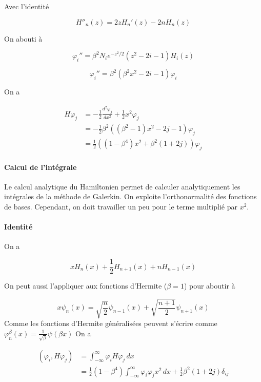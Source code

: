 \documentclass[11pt]{article}
\begin{document}
Avec l'identité

\[
H''_{n}(z)=2zH_{n}'(z)-2nH_{n}(z)
\]

On abouti à

\[
\varphi_{i}''=\beta^{2}N_{i}e^{-z^{2}/2}(z^{2}-2i-1)H_{i}(z)
\]

\[
\varphi_{i}''=\beta^{2}(\beta^{2}x^{2}-2i-1)\varphi_{i}
\]

On a

\[
\begin{aligned}
H\varphi_{j} & = -\frac{1}{2} \frac{d^{2}\varphi_{j}}{dx^{2}} + \frac{1}{2}x^{2}\varphi_{j} \\
&=-\frac{1}{2}\beta^{2}((\beta^{2}-1)x^{2}-2j-1)\varphi_{j} \\
&= \frac{1}{2}((1-\beta^{4})x^{2}+\beta^{2}(1+2j))\varphi_{j}
\end{aligned}
\]

\hypertarget{calcul-de-lintuxe9grale}{%
\paragraph{Calcul de l'intégrale}\label{calcul-de-lintuxe9grale}}

Le calcul analytique du Hamiltonien permet de calculer analytiquement
les intégrales de la méthode de Galerkin. On exploite l'orthonormalité
des fonctions de bases. Cependant, on doit travailler un peu pour le
terme multiplié par \(x^{2}\).

\hypertarget{identituxe9}{%
\paragraph{Identité}\label{identituxe9}}

On a

\[
xH_{n}(x)+ \frac{1}{2}H_{n+1}(x)+nH_{n-1}(x)
\]

On peut aussi l'appliquer aux fonctions d'Hermite (\(\beta =1\)) pour
aboutir à

\[
x\psi_{n}(x)= \sqrt{ \frac{n}{2} }\psi_{n-1}(x)+\sqrt{ \frac{n+1}{2} }\psi_{n+1}(x)
\] Comme les fonctions d'Hermite généralisées peuvent s'écrire comme
\(\varphi_{n}^{\beta}(x) =\frac{1}{\sqrt{ \beta }}\psi(\beta x)\) On a

\[
\begin{align}
(\varphi_{i},H\varphi_{j}) & =\int_{-\infty}^{\infty} \varphi_{i}H\varphi_{j} \, dx  \\
&=\frac{1}{2} (1-\beta^{4})\int_{-\infty}^{\infty} \varphi_{i}\varphi_{j}x^{2} \, dx + \frac{1}{2}\beta^{2}(1+2j)\delta_{ij} 
\end{align}
\]
\end{document}
